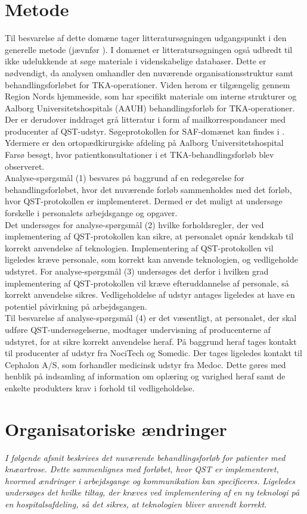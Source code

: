 \section{Metode}
Til besvarelse af dette domæne tager litteratursøgningen udgangspunkt i den generelle metode (jævnfør ). I domænet er litteratursøgningen også udbredt til ikke udelukkende at søge materiale i videnskabelige databaser. Dette er nødvendigt, da analysen omhandler den nuværende organisationsstruktur samt behandlingsforløbet for TKA-operationer. Viden herom er tilgængelig gennem Region Nords hjemmeside, som har specifikt materiale om interne strukturer og Aalborg Universitetshospitals (AAUH) behandlingsforløb for TKA-operationer. Der er derudover inddraget grå litteratur i form af mailkorrespondancer med producenter af QST-udstyr. Søgeprotokollen for SAF-domænet kan findes i . Ydermere er den ortopædkirurgiske afdeling på Aalborg Universitetshospital Farsø besøgt, hvor patientkonsultationer i et TKA-behandlingsforløb blev observeret. \\
Analyse-spørgsmål (1) besvares på baggrund af en redegørelse for behandlingsforløbet, hvor det nuværende forløb sammenholdes med det forløb, hvor QST-protokollen er implementeret. Dermed er det muligt at undersøge forskelle i personalets arbejdsgange og opgaver. \\
Det undersøges for analyse-spørgsmål (2) hvilke forholdsregler, der ved implementering af QST-protokollen kan sikre, at personalet opnår kendskab til korrekt anvendelse af teknologien.
Implementering af QST-protokollen vil ligeledes kræve personale, som korrekt kan anvende teknologien, og vedligeholde udstyret. For analyse-spørgsmål (3) undersøges det derfor i hvilken grad implementering af QST-protokollen vil kræve efteruddannelse af personale, så korrekt anvendelse sikres. Vedligeholdelse af udstyr antages ligeledes at have en potentiel påvirkning på arbejdsgangen. \\
Til besvarelse af analyse-spørgsmål (4) er det væsentligt, at personalet, der skal udføre QST-undersøgelserne, modtager undervisning af producenterne af udstyret, for at sikre korrekt anvendelse heraf. På baggrund heraf tages kontakt til producenter af udstyr fra NociTech og Somedic. Der tages ligeledes kontakt til Cephalon A/S, som forhandler medicinsk udstyr fra Medoc. Dette gøres med henblik på indsamling af information om oplæring og varighed heraf samt de enkelte produkters krav i forhold til vedligeholdelse.

\section{Organisatoriske ændringer}
\textit{I følgende afsnit beskrives det nuværende behandlingsforløb for patienter med knæartrose. Dette sammenlignes med forløbet, hvor QST er implementeret, hvormed ændringer i arbejdsgange og kommunikation kan specificeres. Ligeledes undersøges det hvilke tiltag, der kræves ved implementering af en ny teknologi på en hospitalsafdeling, så det sikres, at teknologien bliver anvendt korrekt.}

